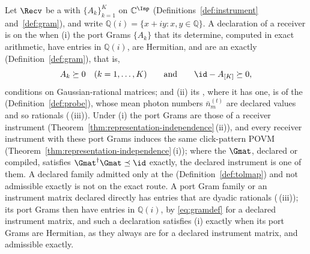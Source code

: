 \begin{definition}\label{def:exact-route}
Let $\Recv$ be a  with
 $\{A_k\}_{k=1}^{K}$ on
$\mathbb{C}^{\Inp}$ (Definitions~\ref{def:instrument} and~\ref{def:gram}),
and write $\mathbb{Q}(i)=\{x+iy:x,y\in\mathbb{Q}\}$. A declaration of a
receiver is on the
 when (i) the port Grams $\{A_k\}$ that its
 determine, computed in exact arithmetic, have entries in
$\mathbb{Q}(i)$, are Hermitian, and are an 
exactly (Definition~\ref{def:gram}), that is,
\begin{equation}\label{eq:exact-admissible}
  A_k\succeq0\quad(k=1,\dots,K)
  \qquad\text{and}\qquad
  \id-A_{[K]}\succeq0 ,
\end{equation}
conditions on Gaussian-rational matrices; and (ii) its
, where it has one, is of the 
(Definition~\ref{def:probe}), whose mean photon numbers $\bar n^{(t)}_m$ are
declared values and so rationals (\,(iii)).
Under (i) the port Grams are those of a receiver instrument
(Theorem~\ref{thm:representation-independence}\,(ii)), and every receiver
instrument with these port Grams induces the same click-pattern POVM
(Theorem~\ref{thm:representation-independence}\,(i)); where the
 $\Gmat$, declared or compiled, satisfies
$\Gmat^\dagger\Gmat\preceq\id$ exactly, the declared instrument is one of
them. A declared family admitted only at the 
(Definition~\ref{def:tolmap}) and not admissible exactly is not on the exact
route. A port Gram family or an instrument matrix declared directly has
entries that are dyadic rationals (\,(iii));
its port Grams then have entries in $\mathbb{Q}(i)$, by \eqref{eq:gramdef}
for a declared instrument matrix, and such a declaration satisfies (i)
exactly when its port Grams are Hermitian, as they always are for a declared
instrument matrix, and admissible exactly.
\end{definition}
